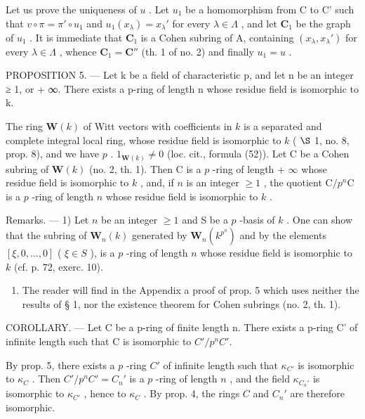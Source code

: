 Let us prove the uniqueness of \(u\) . Let \(u_{1}\) be a homomorphism from C to C' such that \(v \circ \pi = \pi' \circ u_{1}\) and \(u_{1}(x_{\lambda}) = x_{\lambda}'\) for every \(\lambda \in \Lambda\) , and let \(\mathbf{C}_{1}\) be the graph of \(u_{1}\) . It is immediate that \(\mathbf{C}_{1}\) is a Cohen subring of A, containing \((x_{\lambda}, x_{\lambda}')\) for every \(\lambda \in \Lambda\) , whence \(\mathbf{C}_{1} = \mathbf{C}''\) (th. 1 of no. 2) and finally \(u_{1} = u\) .

PROPOSITION 5. --- Let k be a field of characteristic p, and let n be an integer ≥ 1, or + ∞. There exists a p-ring of length n whose residue field is isomorphic to k.

The ring \(\mathbf{W}(k)\) of Witt vectors with coefficients in \(k\) is a separated and complete integral local ring, whose residue field is isomorphic to \(k\) ( \(\S\) 1, no. 8, prop. 8), and we have \(p\) . \(1_{\mathbf{W}(k)} \neq 0\) (loc. cit., formula (52)). Let C be a Cohen subring of \(\mathbf{W}(k)\) (no. 2, th. 1). Then C is a \(p\) -ring of length + \(\infty\) whose residue field is isomorphic to \(k\) , and, if \(n\) is an integer \(\geqslant 1\) , the quotient \(\mathrm{C}/p^{n}\mathrm{C}\) is a \(p\) -ring of length \(n\) whose residue field is isomorphic to \(k\) .

Remarks. --- 1) Let \(n\) be an integer \(\geqslant 1\) and S be a \(p\) -basis of \(k\) . One can show that the subring of \(\mathbf{W}_{n}(k)\) generated by \(\mathbf{W}_{n}(k^{p^{n}})\) and by the elements \([\xi, 0, ..., 0]\) ( \(\xi \in S\) ), is a \(p\) -ring of length \(n\) whose residue field is isomorphic to \(k\) (cf. p. 72, exerc. 10).

\begin{enumerate}
\def\labelenumi{\arabic{enumi})}
\setcounter{enumi}{1}
\tightlist
\item
  The reader will find in the Appendix a proof of prop. 5 which uses neither the results of § 1, nor the existence theorem for Cohen subrings (no. 2, th. 1).
\end{enumerate}

COROLLARY. --- Let C be a p-ring of finite length n. There exists a p-ring C' of infinite length such that C is isomorphic to \(C'/p^{n}C'\).

By prop. 5, there exists a \(p\) -ring \(C'\) of infinite length such that \(\kappa_{C'}\) is isomorphic to \(\kappa_{C}\) . Then \(C'/p^{n}C'=C_{n}'\) is a \(p\) -ring of length \(n\) , and the field \(\kappa_{C_{n}'}\) is isomorphic to \(\kappa_{C'}\) , hence to \(\kappa_{C}\) . By prop. 4, the rings \(C\) and \(C_{n}'\) are therefore isomorphic.

